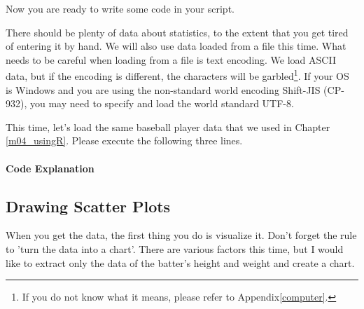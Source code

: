 \documentclass{ltjbook}
\begin{document}
Now you are ready to write some code in your script.

There should be plenty of data about statistics, to the extent that you get tired of entering it by hand. We will also use data loaded from a file this time. What needs to be careful when loading from a file is text encoding. We load ASCII data, but if the encoding is different, the characters will be garbled\footnote{If you do not know what it means, please refer to Appendix\ref{computer}.}. If your OS is Windows and you are using the non-standard world encoding Shift-JIS (CP-932), you may need to specify and load the world standard UTF-8.

This time, let's load the same baseball player data that we used in Chapter \ref{m04_usingR}. Please execute the following three lines.



\paragraph{Code Explanation}


\subsection{Drawing Scatter Plots}
When you get the data, the first thing you do is visualize it. Don't forget the rule to 'turn the data into a chart'.
There are various factors this time, but I would like to extract only the data of the batter's height and weight and create a chart.
\end{document}
